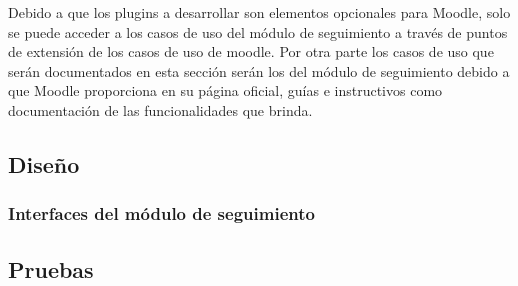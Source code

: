  \noindent
 Debido a que los plugins a desarrollar son elementos opcionales para Moodle, solo se puede
 acceder a los casos de uso del módulo de seguimiento a través de puntos de extensión de los
 casos de uso de moodle. Por otra parte los casos de uso que serán documentados en esta sección
 serán los del módulo de seguimiento debido a que Moodle proporciona en su página oficial, guías
 e instructivos como documentación de las funcionalidades que brinda.



   
   
   
   

\clearpage
\subsection{Diseño}

\subsubsection{Interfaces del módulo de seguimiento}

    
    
    
    
    




\subsection{Pruebas}


